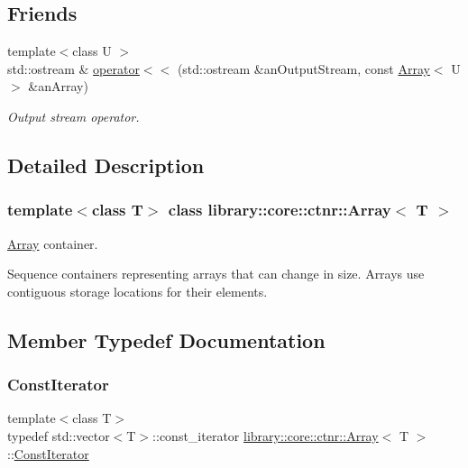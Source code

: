 \subsection*{Friends}
\begin{DoxyCompactItemize}
\item 
{\footnotesize template$<$class U $>$ }\\std\+::ostream \& \mbox{\hyperlink{classlibrary_1_1core_1_1ctnr_1_1_array_a9daa2d638e5bd693776f8bf6caae0802}{operator$<$$<$}} (std\+::ostream \&an\+Output\+Stream, const \mbox{\hyperlink{classlibrary_1_1core_1_1ctnr_1_1_array}{Array}}$<$ U $>$ \&an\+Array)
\begin{DoxyCompactList}\small\item\em Output stream operator. \end{DoxyCompactList}\end{DoxyCompactItemize}


\subsection{Detailed Description}
\subsubsection*{template$<$class T$>$\newline
class library\+::core\+::ctnr\+::\+Array$<$ T $>$}

\mbox{\hyperlink{classlibrary_1_1core_1_1ctnr_1_1_array}{Array}} container. 

\begin{DoxyVerb}                        Sequence containers representing arrays that can change in size.
                        Arrays use contiguous storage locations for their elements. \end{DoxyVerb}
 

\subsection{Member Typedef Documentation}
\mbox{\label{classlibrary_1_1core_1_1ctnr_1_1_array_ac26454f2a2ad4013873386a70aa25fc4}} 
\subsubsection{\texorpdfstring{ConstIterator}{ConstIterator}}
{\footnotesize\ttfamily template$<$class T$>$ \\
typedef std\+::vector$<$T$>$\+::const\+\_\+iterator \mbox{\hyperlink{classlibrary_1_1core_1_1ctnr_1_1_array}{library\+::core\+::ctnr\+::\+Array}}$<$ T $>$\+::\mbox{\hyperlink{classlibrary_1_1core_1_1ctnr_1_1_array_ac26454f2a2ad4013873386a70aa25fc4}{Const\+Iterator}}}

